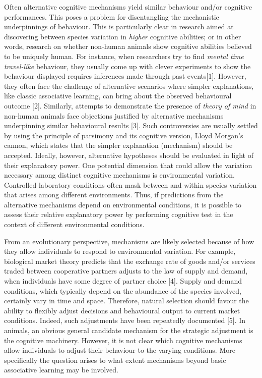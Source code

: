 \documentclass[10pt,letterpaper]{article}
\begin{document}
Often alternative cognitive mechanisms yield similar behaviour and/or
cognitive performances. This poses a problem for disentangling the
mechanistic underpinnings of behaviour. This is particularly clear in
research aimed at discovering between species variation in \emph{higher}
cognitive abilities; or in other words, research on whether non-human
animals show cognitive abilities believed to be uniquely human. For
instance, when researchers try to find \emph{mental time travel-like}
behaviour, they usually come up with clever experiments to show the
behaviour displayed requires inferences made through past events{[}1{]}.
However, they often face the challenge of alternative scenarios where
simpler explanations, like classic associative learning, can bring about
the observed behavioural outcome {[}2{]}. Similarly, attempts to
demonstrate the presence of \emph{theory of mind} in non-human animals
face objections justified by alternative mechanisms underpinning similar
behavioural results {[}3{]}. Such controversies are usually settled by
using the principle of parsimony and its cognitive version, Lloyd
Morgan's cannon, which states that the simpler explanation (mechanism)
should be accepted. Ideally, however, alternative hypotheses should be
evaluated in light of their explanatory power. One potential dimension
that could allow the variation necessary among distinct cognitive
mechanisms is environmental variation. Controlled laboratory conditions
often mask between and within species variation that arises among
different environments. Thus, if predictions from the alternative
mechanisms depend on environmental conditions, it is possible to assess
their relative explanatory power by performing cognitive test in the
context of different environmental conditions.

From an evolutionary perspective, mechanisms are likely selected because
of how they allow individuals to respond to environmental variation. For
example, biological market theory predicts that the exchange rate of
goods and/or services traded between cooperative partners adjusts to the
law of supply and demand, when individuals have some degree of partner
choice {[}4{]}. Supply and demand conditions, which typically depend on
the abundance of the species involved, certainly vary in time and space.
Therefore, natural selection should favour the ability to flexibly
adjust decisions and behavioural output to current market conditions.
Indeed, such adjustments have been repeatedly documented {[}5{]}. In
animals, an obvious general candidate mechanism for the strategic
adjustment is the cognitive machinery. However, it is not clear which
cognitive mechanisms allow individuals to adjust their behaviour to the
varying conditions. More specifically the question arises to what extent
mechanisms beyond basic associative learning may be involved.
\end{document}
